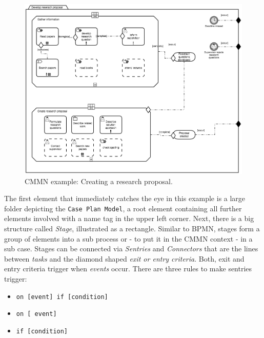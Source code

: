 \begin{figure}

	\label{fig:CMMNex}
	\centering
	\includegraphics[scale=0.5]{../figures/chapter_indicators/CMMN_Example_Proposal_Creation.png} 
		\caption{CMMN example: Creating a research proposal.}
\end{figure}

The first element that immediately catches the eye in this example is a large folder depicting the \texttt{Case Plan Model}, a root element containing all further elements involved with a name tag in the upper left corner. Next, there is a big structure called \textit{Stage}, illustrated as a rectangle. Similar to BPMN, stages form a group of elements into a sub process or - to put it in the CMMN context - in a sub case. Stages can be connected via \textit{Sentries} and \textit{Connectors} that are the lines between \textit{tasks} and the diamond shaped \textit{exit or entry criteria}. Both, exit and entry criteria trigger when \textit{events} occur. There are three rules to make sentries trigger:

\begin{itemize}
\item \texttt{on [event] if [condition]} 
\item \texttt{on [ event]}
\item\texttt{if  [condition]}
\end{itemize}

